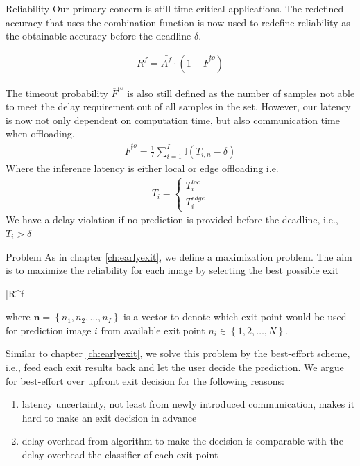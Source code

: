 \begin{enumdescript}
	\item[Reliability]  Our primary concern is still time-critical applications. The redefined accuracy that uses the combination function is now used to redefine reliability as the obtainable accuracy before the deadline $ \delta $.
	
	\begin{align}
	R^f= \bar{A^f} \cdot (1-\overline{F}^{to})
	\end{align}
	
	The timeout probability $ \overline{F}^{to} $ is also still defined as the number of samples not able to meet the delay requirement out of all samples in the set. However, our latency is now not only dependent on computation time, but also communication time when offloading.
	\begin{align}
	\overline{F}^{to}=\frac{1}{I}\sum_{i=1}^{I} \mathbb{I}\left(T_{i,n}-\delta\right)
	\end{align}
	Where the inference latency is either local or edge offloading i.e.
	\begin{align*}
	T_{i} = \begin{cases}
	T_{i}^{loc} \\
	T_{i}^{edge}
	\end{cases}
	\end{align*}
	We have a delay violation if no prediction is provided before the deadline, i.e., $ T_{i} > \delta $  
	
	\item[Problem] As in chapter \ref{ch:earlyexit}, we define a maximization problem. The aim is to maximize the reliability for each image by selecting the best possible exit
	\begin{maxi}
		{}{\bar{R}^f}
		{}{}
	\end{maxi}
	where $ \bm{n} = \left\{ n_1, n_2, \dots, n_I \right\}$ is a vector to denote which exit point would be used for prediction image $ i $ from available exit point $ n_i \in \left\{1,2, \dots, N\right\} $.
	
	Similar to chapter \ref{ch:earlyexit}, we solve this problem by the best-effort scheme, i.e., feed each exit results back and let the user decide the prediction. We argue for best-effort over upfront exit decision for the following reasons:
	\begin{enumerate}
		\item latency uncertainty, not least from newly introduced communication, makes it hard to make an exit decision in advance
		\item delay overhead from algorithm to make the decision is comparable with the delay overhead the classifier of each exit point \cite{li_edge_2018}
	\end{enumerate}
	
	
\end{enumdescript}  

